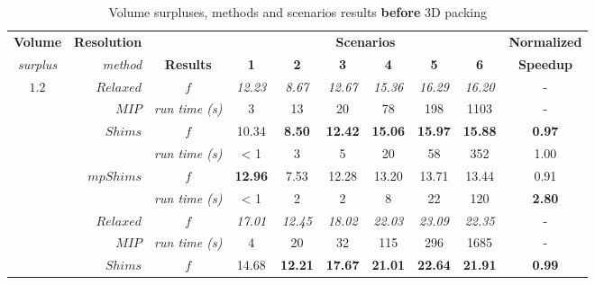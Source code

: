\documentclass[preprint,authoryear]{elsarticle}
\begin{document}
\vspace{2.0mm}

\begin{table}[H]
	\centering
	\caption{Volume surpluses, methods and scenarios results {\bf before} 3D packing}  \label{tab:results}
	\footnotesize
	\begin{tabular}{crcccccccc}
		\toprule
		{\bf Volume}     &{\bf Resolution}&                              &\multicolumn{6}{c}{\bf Scenarios}                                                   &{\bf Normalized}\\
		\cmidrule{4-9}		
		{\it surplus}    &{\it method}    & {\bf Results}      &{\bf 1}    &{\bf 2}    &{\bf 3}    &{\bf 4}    &{\bf 5}    &{\bf 6}    &{\bf Speedup} \\
		\toprule	
		\multirow{7}{*}{$1.2$}&$Relaxed$  & $f$                &{\it 12.23}&{\it 8.67} &{\it 12.67}&{\it 15.36}&{\it 16.29}&{\it 16.20}& - \\%
		&                      $MIP$      & {\it run time (s)} &     3     &     13    &     20    &     78    &      198  &     1103  & - \\%
		\cmidrule{2-10}		                       
		&\multirow{2}{*}{ $Shims$}        & $f$                &     10.34 &{\bf 8.50} &{\bf 12.42}&{\bf 15.06}&{\bf 15.97}&{\bf 15.88}&{\bf 0.97} \\%
		&                                 & {\it run time (s)} &     < 1   &     3     &     5     &     20    &     58    &     352   &  1.00 \\%
		\cmidrule{2-10}		                       
		&\multirow{2}{*}{ $mpShims$}      & $f$                &{\bf 12.96}&   7.53    &  12.28    &   13.20   &  13.71    &   13.44   &  0.91\\%
		&                                 & {\it run time (s)} &     < 1   &     2     &     2     &     8     &     22    &     120   &  {\bf 2.80}\\%
		\toprule		
		\multirow{7}{*}{$1.5$}&$Relaxed$  & $f$                &{\it 17.01}&{\it 12.45}&{\it 18.02}&{\it 22.03}&{\it 23.09}&{\it 22.35}& - \\%
		&                       $MIP$     & {\it run time (s)} &     4     &     20    &     32    &     115   &     296   &     1685  &  -\\%
        \cmidrule{2-10}		                       
        &\multirow{2}{*}{ $Shims$}        & $f$                &     14.68 &{\bf 12.21}&{\bf 17.67}&{\bf 21.01}&{\bf 22.64}&{\bf 21.91}&{\bf 0.99}  \\%

\end{tabular}
\end{table}
\end{document}
